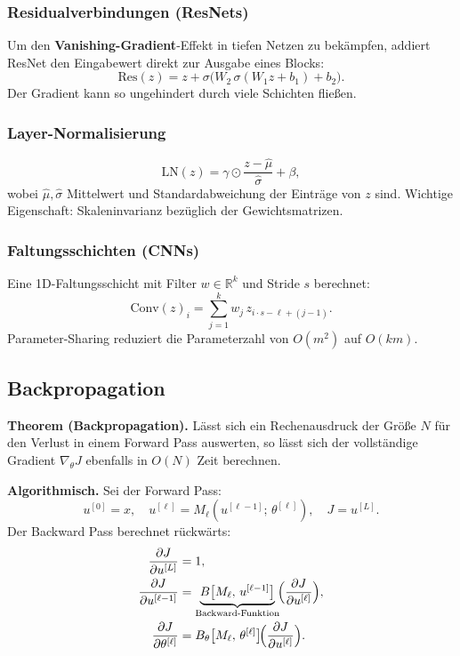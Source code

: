 \documentclass[11pt]{article}
\theoremstyle{csthm}
\theoremstyle{csdef}
\newcommand{\R}{\mathbb{R}}
\begin{document}
\subsubsection*{Residualverbindungen (ResNets)}

Um den \textbf{Vanishing-Gradient}-Effekt in tiefen Netzen zu bekämpfen,
addiert ResNet den Eingabewert direkt zur Ausgabe eines Blocks:
\begin{equation}
  \text{Res}(z) = z + \sigma\!\bigl(W_2\,\sigma(W_1 z + b_1) + b_2\bigr).
\end{equation}
Der Gradient kann so ungehindert durch viele Schichten fließen.

\subsubsection*{Layer-Normalisierung}

\begin{equation}
  \mathrm{LN}(z) = \gamma \odot \frac{z - \hat\mu}{\hat\sigma} + \beta,
\end{equation}
wobei $\hat\mu, \hat\sigma$ Mittelwert und Standardabweichung der Einträge
von $z$ sind. Wichtige Eigenschaft: Skaleninvarianz bezüglich der
Gewichtsmatrizen.

\subsubsection*{Faltungsschichten (CNNs)}

Eine 1D-Faltungsschicht mit Filter $w \in \R^k$ und Stride $s$ berechnet:
\begin{equation}
  \mathrm{Conv}(z)_i = \sum_{j=1}^k w_j \, z_{i \cdot s - \ell + (j-1)}.
\end{equation}
Parameter-Sharing reduziert die Parameterzahl von $O(m^2)$ auf $O(km)$.

\subsection{Backpropagation}

\begin{tcolorbox}[thmstyle]
\textbf{Theorem (Backpropagation).}
Lässt sich ein Rechenausdruck der Größe $N$ für den Verlust in einem Forward
Pass auswerten, so lässt sich der vollständige Gradient $\nabla_\theta J$
ebenfalls in $O(N)$ Zeit berechnen.
\end{tcolorbox}

\textbf{Algorithmisch.} Sei der Forward Pass:
\[
  u^{[0]} = x, \quad u^{[\ell]} = M_\ell(u^{[\ell-1]};\,\theta^{[\ell]}),
  \quad J = u^{[L]}.
\]
Der Backward Pass berechnet rückwärts:
\begin{align}
  \frac{\partial J}{\partial u^{[L]}} &= 1, \\
  \frac{\partial J}{\partial u^{[\ell-1]}}
    &= \underbrace{B\bigl[M_\ell,\, u^{[\ell-1]}\bigr]}_{\text{Backward-Funktion}}
       \!\Bigl(\frac{\partial J}{\partial u^{[\ell]}}\Bigr), \\
  \frac{\partial J}{\partial \theta^{[\ell]}}
    &= B_\theta\bigl[M_\ell,\, \theta^{[\ell]}\bigr]
       \!\Bigl(\frac{\partial J}{\partial u^{[\ell]}}\Bigr).
\end{align}
\end{document}
